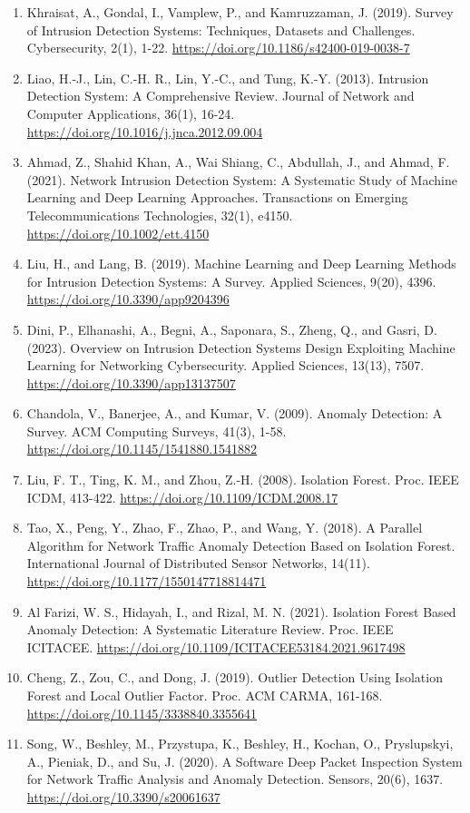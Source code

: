 \documentclass[12pt,a4paper]{article}
\begin{document}
\begin{enumerate}
\item Khraisat, A., Gondal, I., Vamplew, P., and Kamruzzaman, J. (2019). Survey of Intrusion Detection Systems: Techniques, Datasets and Challenges. Cybersecurity, 2(1), 1-22. \url{https://doi.org/10.1186/s42400-019-0038-7}
\item Liao, H.-J., Lin, C.-H. R., Lin, Y.-C., and Tung, K.-Y. (2013). Intrusion Detection System: A Comprehensive Review. Journal of Network and Computer Applications, 36(1), 16-24. \url{https://doi.org/10.1016/j.jnca.2012.09.004}
\item Ahmad, Z., Shahid Khan, A., Wai Shiang, C., Abdullah, J., and Ahmad, F. (2021). Network Intrusion Detection System: A Systematic Study of Machine Learning and Deep Learning Approaches. Transactions on Emerging Telecommunications Technologies, 32(1), e4150. \url{https://doi.org/10.1002/ett.4150}
\item Liu, H., and Lang, B. (2019). Machine Learning and Deep Learning Methods for Intrusion Detection Systems: A Survey. Applied Sciences, 9(20), 4396. \url{https://doi.org/10.3390/app9204396}
\item Dini, P., Elhanashi, A., Begni, A., Saponara, S., Zheng, Q., and Gasri, D. (2023). Overview on Intrusion Detection Systems Design Exploiting Machine Learning for Networking Cybersecurity. Applied Sciences, 13(13), 7507. \url{https://doi.org/10.3390/app13137507}
\item Chandola, V., Banerjee, A., and Kumar, V. (2009). Anomaly Detection: A Survey. ACM Computing Surveys, 41(3), 1-58. \url{https://doi.org/10.1145/1541880.1541882}
\item Liu, F. T., Ting, K. M., and Zhou, Z.-H. (2008). Isolation Forest. Proc. IEEE ICDM, 413-422. \url{https://doi.org/10.1109/ICDM.2008.17}
\item Tao, X., Peng, Y., Zhao, F., Zhao, P., and Wang, Y. (2018). A Parallel Algorithm for Network Traffic Anomaly Detection Based on Isolation Forest. International Journal of Distributed Sensor Networks, 14(11). \url{https://doi.org/10.1177/1550147718814471}
\item Al Farizi, W. S., Hidayah, I., and Rizal, M. N. (2021). Isolation Forest Based Anomaly Detection: A Systematic Literature Review. Proc. IEEE ICITACEE. \url{https://doi.org/10.1109/ICITACEE53184.2021.9617498}
\item Cheng, Z., Zou, C., and Dong, J. (2019). Outlier Detection Using Isolation Forest and Local Outlier Factor. Proc. ACM CARMA, 161-168. \url{https://doi.org/10.1145/3338840.3355641}
\item Song, W., Beshley, M., Przystupa, K., Beshley, H., Kochan, O., Pryslupskyi, A., Pieniak, D., and Su, J. (2020). A Software Deep Packet Inspection System for Network Traffic Analysis and Anomaly Detection. Sensors, 20(6), 1637. \url{https://doi.org/10.3390/s20061637}

\end{enumerate}
\end{document}
